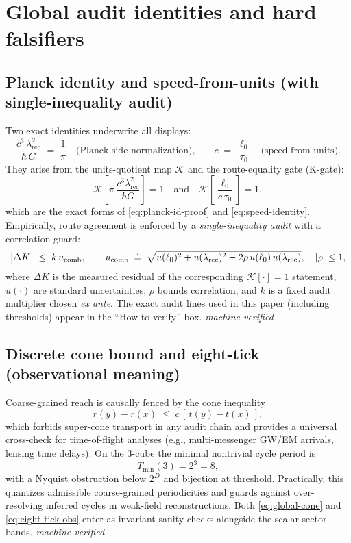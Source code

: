 \documentclass[12pt,a4paper]{article}
\begin{document}
\section{Global audit identities and hard falsifiers}

\subsection{Planck identity and speed-from-units (with single-inequality audit)}
Two exact identities underwrite all displays:
\begin{equation}
  \frac{c^{3}\,\lambda_{\mathrm{rec}}^{2}}{\hbar\,G} \;=\; \frac{1}{\pi}
  \quad\text{(Planck-side normalization),}
  \qquad
  c \;=\; \frac{\ell_0}{\tau_0}
  \quad\text{(speed-from-units).}
  \label{eq:planck-speed-identities}
\end{equation}
They arise from the units-quotient map \(\mathcal{K}\) and the route-equality gate (K-gate):
\[
\mathcal{K}\!\left[\pi\,\frac{c^{3}\lambda_{\mathrm{rec}}^{2}}{\hbar G}\right]=1
\quad\text{and}\quad
\mathcal{K}\!\left[\frac{\ell_0}{c\,\tau_0}\right]=1,
\]
which are the exact forms of \eqref{eq:planck-id-proof} and \eqref{eq:speed-identity}. Empirically, route agreement is enforced by a \emph{single-inequality audit} with a correlation guard:
\begin{equation}
  \bigl|\Delta K\bigr| \;\le\; k\,u_{\rm comb},
  \qquad
  u_{\rm comb}\;\doteq\; \sqrt{u(\ell_0)^2+u(\lambda_{\rm rec})^2-2\rho\,u(\ell_0)\,u(\lambda_{\rm rec})},
  \quad |\rho|\le 1,
  \label{eq:single-inequality-audit}
\end{equation}
where \(\Delta K\) is the measured residual of the corresponding \(\mathcal{K}[\cdot]=1\) statement, \(u(\cdot)\) are standard uncertainties, \(\rho\) bounds correlation, and \(k\) is a fixed audit multiplier chosen \emph{ex ante}. The exact audit lines used in this paper (including thresholds) appear in the “How to verify” box. \emph{machine-verified}

\subsection{Discrete cone bound and eight-tick (observational meaning)}
Coarse-grained reach is causally fenced by the cone inequality
\begin{equation}
  r(y)-r(x) \;\le\; c\,[\,t(y)-t(x)\,],
  \label{eq:global-cone}
\end{equation}
which forbids super-cone transport in any audit chain and provides a universal cross-check for time-of-flight analyses (e.g., multi-messenger GW/EM arrivals, lensing time delays). On the 3-cube the minimal nontrivial cycle period is
\begin{equation}
  T_{\min}(3)=2^{3}=8,
  \label{eq:eight-tick-obs}
\end{equation}
with a Nyquist obstruction below \(2^{D}\) and bijection at threshold. Practically, this quantizes admissible coarse-grained periodicities and guards against over-resolving inferred cycles in weak-field reconstructions. Both \eqref{eq:global-cone} and \eqref{eq:eight-tick-obs} enter as invariant sanity checks alongside the scalar-sector bands. \emph{machine-verified}
\end{document}
